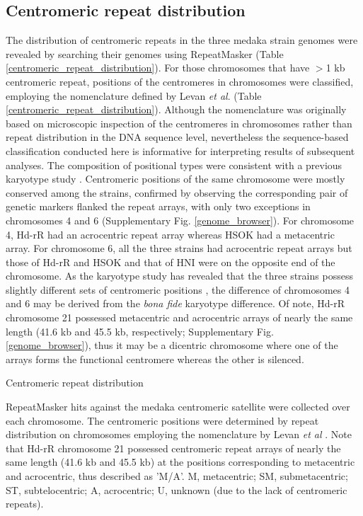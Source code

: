 \subsection*{Centromeric repeat distribution}
  The distribution of centromeric repeats in the three medaka strain genomes were revealed by searching their genomes using RepeatMasker (Table \ref{centromeric_repeat_distribution}). For those chromosomes that have $>$1 kb centromeric repeat, positions of the centromeres in chromosomes were classified, employing the nomenclature defined by Levan \textit{et al}. \cite{levan1964} (Table \ref{centromeric_repeat_distribution}). Although the nomenclature was originally based on microscopic inspection of the centromeres in chromosomes rather than repeat distribution in the DNA sequence level, nevertheless the sequence-based classification conducted here is informative for interpreting results of subsequent analyses. The composition of positional types were consistent with a previous karyotype study \cite{}. Centromeric positions of the same chromosome were mostly conserved among the strains, confirmed by observing the corresponding pair of genetic markers flanked the repeat arrays, with only two exceptions in chromosomes 4 and 6 (Supplementary Fig. \ref{genome_browser}). For chromosome 4, Hd-rR had an acrocentric repeat array whereas HSOK had a metacentric array. For chromosome 6, all the three strains had acrocentric repeat arrays but those of Hd-rR and HSOK and that of HNI were on the opposite end of the chromosome. As the karyotype study has revealed that the three strains possess slightly different sets of centromeric positions \cite{}, the difference of chromosomes 4 and 6 may be derived from the \textit{bona fide} karyotype difference. Of note, Hd-rR chromosome 21 possessed metacentric and acrocentric arrays of nearly the same length (41.6 kb and 45.5 kb, respectively; Supplementary Fig. \ref{genome_browser}), thus it may be a dicentric chromosome where one of the arrays forms the functional centromere whereas the other is silenced.


  \begin{table*}[htp]
    \centering
    \caption{Centromeric repeat distribution}
    
    \label{centromeric_repeat_distribution}
    \caption*{{\small
      RepeatMasker hits against the medaka centromeric satellite were collected over each chromosome. The centromeric positions were determined by repeat distribution on chromosomes employing the nomenclature by Levan \textit{et al} \cite{Levan1964}. Note that Hd-rR chromosome 21 possessed centromeric repeat arrays of nearly the same length (41.6 kb and 45.5 kb) at the positions corresponding to metacentric and acrocentric, thus described as 'M/A'. M, metacentric; SM, submetacentric; ST, subtelocentric; A, acrocentric; U, unknown (due to the lack of centromeric repeats).
    }}
  \end{table*}


